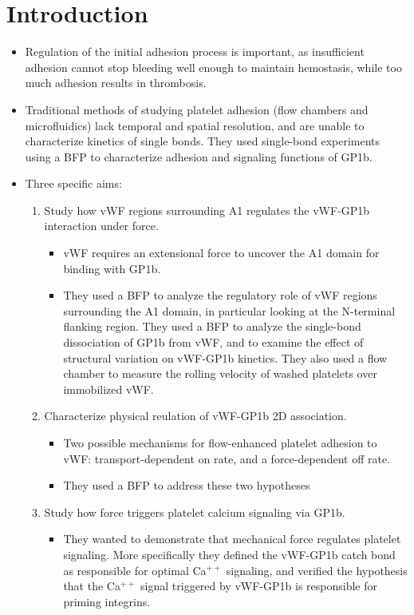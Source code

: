 \documentclass[
10pt, %
letterpaper, %
twocolumn, %
landscape %
]{article}
\newcommand{\inta}[1]{\textalpha\textsubscript{#1}}
\begin{document}

\section{Introduction}
\label{sec:introduction}

\begin{itemize}
\item Regulation of the initial adhesion process is important, as
  insufficient adhesion cannot stop bleeding well enough to maintain
  hemostasis, while too much adhesion results in thrombosis.
\item Traditional methods of studying platelet adhesion (flow chambers
  and microfluidics) lack temporal and spatial resolution, and are
  unable to characterize kinetics of single bonds. They used
  single-bond experiments using a BFP to characterize adhesion and
  signaling functions of GP1b.
\item Three specific aims:
  \begin{enumerate}
  \item Study how vWF regions surrounding A1 regulates the
    vWF-GP1b\inta{} interaction under force.
    \begin{itemize}
    \item vWF requires an extensional force to uncover the A1 domain
      for binding with GP1b.
    \item They used a BFP to analyze the regulatory role of vWF
      regions surrounding the A1 domain, in particular looking at the
      N-terminal flanking region. They used a BFP to analyze the
      single-bond dissociation of GP1b\inta{} from vWF, and to examine
      the effect of structural variation on vWF-GP1b\inta{}
      kinetics. They also used a flow chamber to measure the rolling
      velocity of washed platelets over immobilized vWF.
    \end{itemize}
  \item Characterize physical reulation of vWF-GP1b\inta{} 2D
    association.
    \begin{itemize}
    \item Two possible mechanisms for flow-enhanced platelet adhesion
      to vWF: transport-dependent on rate, and a force-dependent off
      rate.
    \item They used a BFP to address these two hypotheses
    \end{itemize}
  \item Study how force triggers platelet calcium signaling via
    GP1b\inta{}.
    \begin{itemize}
    \item They wanted to demonstrate that mechanical force regulates
      platelet signaling. More specifically they defined the
      vWF-GP1b\inta{} catch bond as responsible for optimal Ca$^{++}$
      signaling, and verified the hypothesis that the Ca$^{++}$ signal
      triggered by vWF-GP1b\inta{} is responsible for priming integrins.
    \end{itemize}
  \end{enumerate}
\end{itemize}
\end{document}
